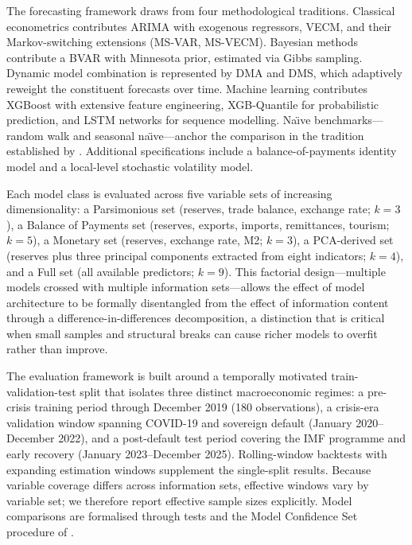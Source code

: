 \documentclass[12pt,a4paper]{article}
\begin{document}
The forecasting framework draws from four methodological traditions. Classical econometrics contributes ARIMA with exogenous regressors, VECM, and their Markov-switching extensions (MS-VAR, MS-VECM). Bayesian methods contribute a BVAR with Minnesota prior, estimated via Gibbs sampling. Dynamic model combination is represented by DMA and DMS, which adaptively reweight the constituent forecasts over time. Machine learning contributes XGBoost with extensive feature engineering, XGB-Quantile for probabilistic prediction, and LSTM networks for sequence modelling. Na\"{\i}ve benchmarks---random walk and seasonal na\"{\i}ve---anchor the comparison in the tradition established by \cite{MeeseRogoff1983}. Additional specifications include a balance-of-payments identity model and a local-level stochastic volatility model.

Each model class is evaluated across five variable sets of increasing dimensionality: a Parsimonious set (reserves, trade balance, exchange rate; $k=3$), a Balance of Payments set (reserves, exports, imports, remittances, tourism; $k=5$), a Monetary set (reserves, exchange rate, M2; $k=3$), a PCA-derived set (reserves plus three principal components extracted from eight indicators; $k=4$), and a Full set (all available predictors; $k=9$). This factorial design---multiple models crossed with multiple information sets---allows the effect of model architecture to be formally disentangled from the effect of information content through a difference-in-differences decomposition, a distinction that is critical when small samples and structural breaks can cause richer models to overfit rather than improve.

The evaluation framework is built around a temporally motivated train-validation-test split that isolates three distinct macroeconomic regimes: a pre-crisis training period through December 2019 (180 observations), a crisis-era validation window spanning COVID-19 and sovereign default (January 2020--December 2022), and a post-default test period covering the IMF programme and early recovery (January 2023--December 2025). Rolling-window backtests with expanding estimation windows supplement the single-split results. Because variable coverage differs across information sets, effective windows vary by variable set; we therefore report effective sample sizes explicitly. Model comparisons are formalised through \cite{DieboldMariano1995} tests and the Model Confidence Set procedure of \cite{HansenLundeNason2011}.
\end{document}
